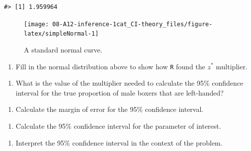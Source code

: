 \documentclass[
]{report}
\providecommand{\tightlist}{%
  \setlength{\itemsep}{0pt}\setlength{\parskip}{0pt}}
\begin{document}
\begin{verbatim}
#> [1] 1.959964
\end{verbatim}

\begin{figure}

{\centering \texttt{[image: 08-A12-inference-1cat\_CI-theory\_files/figure-latex/simpleNormal-1]} 

}

\caption{A standard normal curve.}\label{fig:simpleNormal}
\end{figure}

\begin{enumerate}
\def\labelenumi{\arabic{enumi}.}
\setcounter{enumi}{2}
\tightlist
\item
  Fill in the normal distribution above to show how \texttt{R} found the \(z^*\) multiplier.
\end{enumerate}

\vspace{0.1in}

\begin{enumerate}
\def\labelenumi{\arabic{enumi}.}
\setcounter{enumi}{3}
\tightlist
\item
  What is the value of the multiplier needed to calculate the 95\% confidence interval for the true proportion of male boxers that are left-handed?
\end{enumerate}

\vspace{1in}

\begin{enumerate}
\def\labelenumi{\arabic{enumi}.}
\setcounter{enumi}{4}
\tightlist
\item
  Calculate the margin of error for the 95\% confidence interval.
\end{enumerate}

\vspace{1in}

\begin{enumerate}
\def\labelenumi{\arabic{enumi}.}
\setcounter{enumi}{5}
\tightlist
\item
  Calculate the 95\% confidence interval for the parameter of interest.
\end{enumerate}

\vspace{0.5in}

\begin{enumerate}
\def\labelenumi{\arabic{enumi}.}
\setcounter{enumi}{6}
\tightlist
\item
  Interpret the 95\% confidence interval in the context of the problem.
\end{enumerate}
\end{document}
